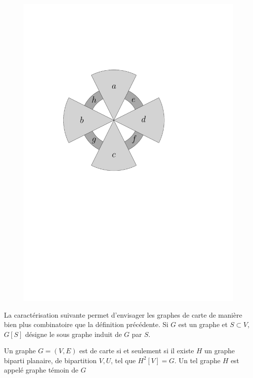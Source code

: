 \documentclass{scrartcl}
\begin{document}
\begin{flushleft}
\begin{figure}[h]
\begin{center}
    \hspace*{1cm}
    \includegraphics*[page=\ipeFigfirsttemoin, scale = 0.38]{figs}
    \end{center}
\end{figure}

La caractérisation suivante permet d'envisager les graphes de carte de manière bien plus combinatoire que la définition précédente.
Si $G$ est un graphe et $S \subset V$, $G[S]$ désigne le sous graphe induit de $G$ par $S$.

\begin{theorem}\label{carCarte}
    Un graphe $G = (V, E)$ est de carte si et seulement si il existe $H$ un graphe biparti planaire, de bipartition $V, U$,
    tel que $H^2[V] = G$. Un tel graphe $H$ est appelé graphe témoin de $G$
\end{theorem}


\end{flushleft}
\end{document}
